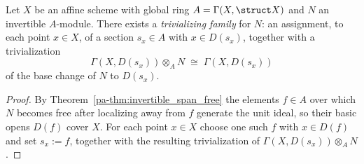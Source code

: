 \begin{lemma}
  \label{pa-lem:trivializingFamily_nonempty}
  \leanok

  Let \(X\) be an affine scheme with global ring \(A = \Gamma(X,\struct X)\) and \(N\) an
  invertible \(A\)-module. There exists a \emph{trivializing family} for \(N\): an assignment,
  to each point \(x \in X\), of a section \(s_x \in A\) with \(x \in D(s_x)\), together with a
  trivialization
  \[
    \Gamma(X,D(s_x)) \otimes_A N \;\cong\; \Gamma(X,D(s_x))
  \]
  of the base change of \(N\) to \(D(s_x)\).
\end{lemma}
\begin{proof}
  \leanok
  By Theorem~\ref{pa-thm:invertible_span_free} the elements \(f \in A\) over which \(N\) becomes
  free after localizing away from \(f\) generate the unit ideal, so their basic opens \(D(f)\)
  cover \(X\). For each point \(x \in X\) choose one such \(f\) with \(x \in D(f)\) and set
  \(s_x := f\), together with the resulting trivialization of \(\Gamma(X,D(s_x)) \otimes_A
  N\).
\end{proof}

